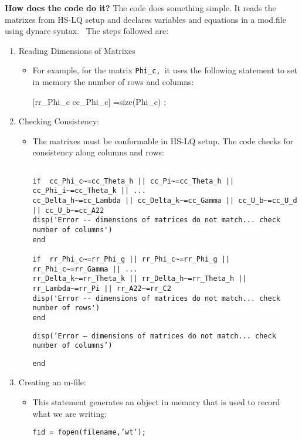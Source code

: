 \documentclass[letter, fleqn, 11pt]{article}
\begin{document}
\textbf{How does the code do it?} \bigskip The code does something
simple. It reads the matrixes from HS-LQ setup and declares variables and
equations in a mod.file using dynare syntax. \ The steps followed are:

\begin{enumerate}
\item Reading Dimensions of Matrixes

\begin{itemize}
\item For example, for the matrix \texttt{Phi\_c, }it uses the following
statement to set in memory the number of rows and columns:

[rr\_Phi\_c cc\_Phi\_c] =size(Phi\_c) ;
\end{itemize}

\item Checking Consistency:

\begin{itemize}
\item The matrixes must be conformable in HS-LQ setup. The code checks for
consistency along columns and rows:

\small
\begin{verbatim}

if  cc_Phi_c~=cc_Theta_h || cc_Pi~=cc_Theta_h || cc_Phi_i~=cc_Theta_k || ...
cc_Delta_h~=cc_Lambda || cc_Delta_k~=cc_Gamma || cc_U_b~=cc_U_d || cc_U_b~=cc_A22
disp('Error -- dimensions of matrices do not match... check number of columns')
end

if  rr_Phi_c~=rr_Phi_g || rr_Phi_c~=rr_Phi_g || rr_Phi_c~=rr_Gamma || ...
rr_Delta_k~=rr_Theta_k || rr_Delta_h~=rr_Theta_h || rr_Lambda~=rr_Pi || rr_A22~=rr_C2
disp('Error -- dimensions of matrices do not match... check number of rows')
end

\end{verbatim}
\normalsize
\texttt{\qquad disp('Error -- dimensions of matrices do not match... check
number of columns')}

\texttt{end}
\end{itemize}

\item Creating an m-file:

\begin{itemize}
\item This statement generates an object in memory that is used to record
what we are writing:

\texttt{fid = fopen(filename,'wt');}
\end{itemize}


\end{enumerate}
\end{document}
